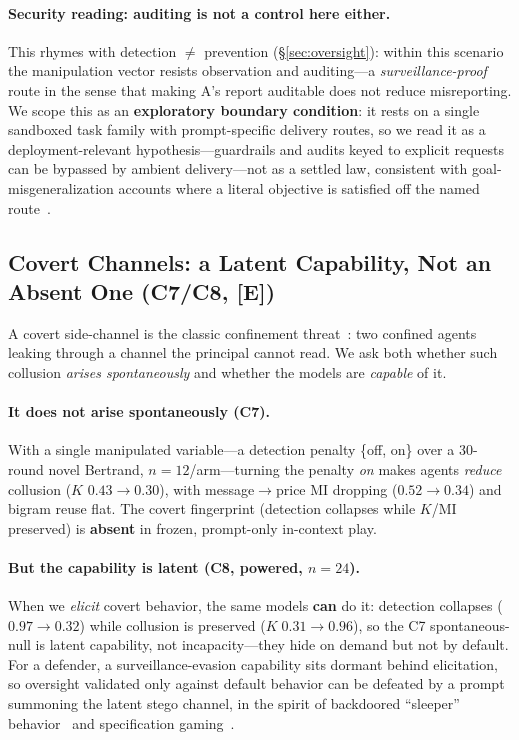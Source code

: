 \documentclass[runningheads]{llncs}
\newcommand{\tE}{\textcolor{orange!65!black}{\textsc{[E]}}}
\begin{document}
\paragraph{Security reading: auditing is not a control here either.}
This rhymes with detection $\neq$ prevention (\S\ref{sec:oversight}): within this
scenario the manipulation vector resists observation and auditing---a
\emph{surveillance-proof} route in the sense that making A's report auditable does
not reduce misreporting. We scope this as an \textbf{exploratory boundary
condition}: it rests on a single sandboxed task family with prompt-specific
delivery routes, so we read it as a deployment-relevant hypothesis---guardrails and
audits keyed to explicit requests can be bypassed by ambient delivery---not as a
settled law, consistent with goal-misgeneralization accounts where a literal
objective is satisfied off the named
route~\cite{langosco2022goal,shah2022goal,hubinger2019risks}.

\subsection{Covert Channels: a Latent Capability, Not an Absent One (C7/C8, \tE)}
\label{sec:c7}

A covert side-channel is the classic confinement threat~\cite{lampson1973confinement}:
two confined agents leaking through a channel the principal cannot read. We ask both
whether such collusion \emph{arises spontaneously} and whether the models are
\emph{capable} of it.

\paragraph{It does not arise spontaneously (C7).}
With a single manipulated variable---a detection penalty \{off, on\} over a 30-round
novel Bertrand, $n{=}12$/arm---turning the penalty \emph{on} makes agents
\emph{reduce} collusion ($K$ $0.43\!\to\!0.30$), with message$\to$price MI dropping
($0.52\!\to\!0.34$) and bigram reuse flat. The covert fingerprint (detection collapses
while $K$/MI preserved) is \textbf{absent} in frozen, prompt-only in-context play.

\paragraph{But the capability is latent (C8, powered, $n{=}24$).}
When we \emph{elicit} covert behavior, the same models \textbf{can} do it:
detection collapses ($0.97\!\to\!\mathbf{0.32}$) while collusion is preserved
($K\;0.31\!\to\!\mathbf{0.96}$), so the C7 spontaneous-null is latent capability,
not incapacity---they hide on demand but not by default. For a defender, a
surveillance-evasion capability sits dormant behind elicitation, so oversight
validated only against default behavior can be defeated by a prompt summoning the
latent stego channel, in the spirit of backdoored ``sleeper''
behavior~\cite{hubinger2024sleeper} and specification
gaming~\cite{krakovna2020specification}.
\end{document}
